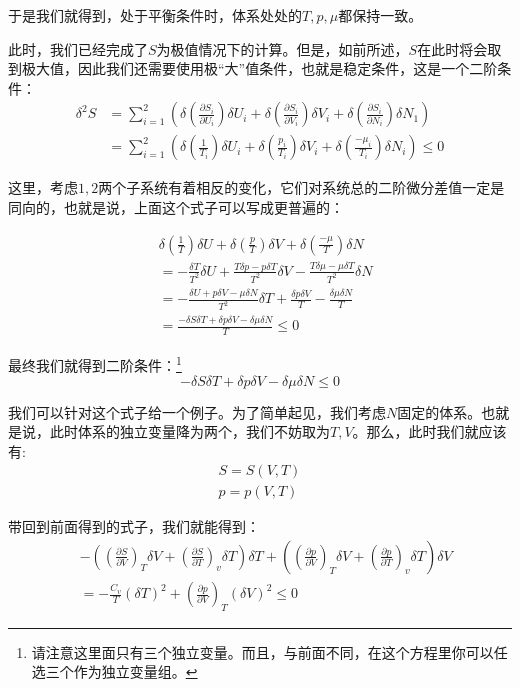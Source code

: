 \documentclass[a4paper, 10pt, openany]{book}%
\begin{document}
于是我们就得到，处于平衡条件时，体系处处的$T,p,\mu$都保持一致。

此时，我们已经完成了$S$为极值情况下的计算。但是，如前所述，$S$在此时将会取到极大值，因此我们还需要使用极“大”值条件，也就是稳定条件，这是一个二阶条件：
\begin{align}
\delta^2 S&=\sum_{i=1}^2\left(\delta\left(\frac{\partial S_i}{\partial U_i}\right)\delta U_i+\delta\left(\frac{\partial S_i}{\partial V_i}\right)\delta V_i+\delta\left(\frac{\partial S_i}{\partial N_i}\right)\delta N_1\right)\\
&=\sum_{i=1}^2\left(\delta\left(\frac{1}{T_i}\right)\delta U_i+\delta\left(\frac{p_i}{T_i}\right)\delta V_i+\delta\left(\frac{-\mu_i}{T_i}\right)\delta N_i\right)\leq0
\end{align}

这里，考虑$1,2$两个子系统有着相反的变化，它们对系统总的二阶微分差值一定是同向的，也就是说，上面这个式子可以写成更普遍的：

\begin{align}
 & \delta\left(\frac{1}{T}\right)\delta U+\delta\left(\frac{p}{T}\right)\delta V+\delta\left(\frac{-\mu}{T}\right)\delta N\\
  &=-\frac{\delta T}{T^2}\delta U+\frac{T\delta p-p\delta T}{T^2}\delta V-\frac{T\delta\mu-\mu\delta T}{T^2}\delta N\\
  &=-\frac{\delta U+p\delta V-\mu\delta N}{T^2}\delta T+\frac{\delta p\delta V}{T}-\frac{\delta\mu\delta N}{T}\\
  &=\frac{-\delta S\delta T+\delta p\delta V-\delta\mu\delta N}{T}\leq0
\end{align}

最终我们就得到二阶条件：\footnote{请注意这里面只有三个独立变量。而且，与前面不同，在这个方程里你可以任选三个作为独立变量组。}
\begin{equation}
  -\delta S\delta T+\delta p\delta V-\delta\mu\delta N\leq0
\end{equation}

我们可以针对这个式子给一个例子。为了简单起见，我们考虑$N$固定的体系。也就是说，此时体系的独立变量降为两个，我们不妨取为$T,V$。那么，此时我们就应该有:
\begin{align}
  S=S(V,T)\\
  p=p(V,T)\end{align}

  带回到前面得到的式子，我们就能得到：
  \begin{align}
    &-\left(\left(\frac{\partial S}{\partial V}\right)_T\delta V+\left(\frac{\partial S}{\partial T}\right)_v\delta T\right)\delta T+\left(\left(\frac{\partial p}{\partial V}\right)_T\delta V+\left(\frac{\partial p}{\partial T}\right)_v\delta T\right)\delta V\\
    &=-\frac{C_v}{T}(\delta T)^2+\left(\frac{\partial p}{\partial V}\right)_T(\delta V)^2\leq0
  \end{align}  
\end{document}

